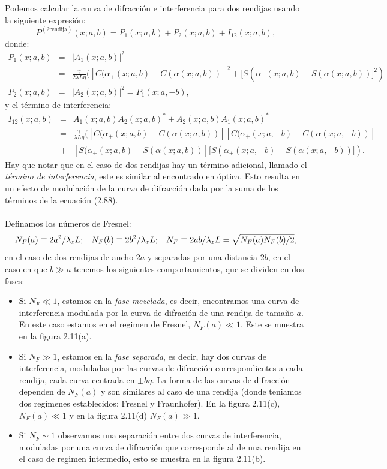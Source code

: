 Podemos calcular la curva de difracción e interferencia para dos rendijas usando la siguiente expresión:
\begin{equation}
P^{(2\text{rendija})}(x;a,b)=P_{1}(x;a,b)+P_{2}(x;a,b)+I_{12}(x;a,b) ,
\end{equation}
donde:
\begin{eqnarray}
\nonumber P_{1}(x;a,b)&=&|A_1(x;a,b)|^2\\
\nonumber &=&\frac{\gamma}{2\lambda L\eta}([C(\alpha_{+}(x;a,b)-C(\alpha(x;a,b))]^{2}+[S(\alpha_{+}(x;a,b)-S(\alpha(x;a,b))]^{2})\\
P_2(x;a,b)&=&|A_2(x;a,b)|^2=P_1(x;a,-b) ,
\end{eqnarray}
y el término de interferencia:
\begin{eqnarray}
\nonumber I_{12}(x;a,b)&=& A_1(x;a,b)A_2(x;a,b)^*+A_2(x;a,b)A_1(x;a,b)^*\\
\nonumber &=&\frac{\gamma}{\lambda L\eta}([C(\alpha_{+}(x;a,b)-C(\alpha(x;a,b))][C(\alpha_{+}(x;a,-b)-C(\alpha(x;a,-b))]\\
&+& [S(\alpha_{+}(x;a,b)-S(\alpha(x;a,b))][S(\alpha_{+}(x;a,-b)-S(\alpha(x;a,-b))]) .
\end{eqnarray}
Hay que notar que en el caso de dos rendijas hay un término adicional, llamado el \textit{término de interferencia}, este es similar al encontrado en óptica. Esto resulta en un efecto de modulación de la curva de difracción dada por la suma de los términos de la ecuación (2.88).\\
\\
Definamos los números de Fresnel:
\begin{equation}
N_F(a)\equiv 2a^2/\lambda_zL ;\hspace{0.3cm} N_F(b)\equiv 2b^2/\lambda_zL ;\hspace{0.3cm} N_F\equiv 2ab/\lambda_zL=\sqrt{N_F(a)N_F(b)/2} ,
\end{equation}
en el caso de dos rendijas de ancho $2a$ y separadas por una distancia $2b$, en el caso en que $b\gg a$ tenemos los siguientes comportamientos, que se dividen en dos fases:
\begin{itemize}
\item Si $N_F\ll 1$, estamos en la \textit{fase mezclada}, es decir, encontramos una curva de interferencia modulada por la curva de difración de una rendija de tamaño $a$. En este caso estamos en el regimen de Fresnel, $N_F(a)\ll 1$. Este se muestra en la figura 2.11(a). 
\item Si $N_F\gg 1$, estamos en la \textit{fase separada}, es decir, hay dos curvas de interferencia, moduladas por las curvas de difracción correspondientes a cada rendija, cada curva centrada en $\pm b\eta$.	La forma de las curvas de difracción dependen de $N_F(a)$ y son similares al caso de una rendija (donde teniamos dos regímenes establecidos: Fresnel y Fraunhofer). En la figura 2.11(c), $N_F(a)\ll 1$ y en la figura 2.11(d) $N_F(a)\gg 1$.
\item Si $N_F\sim 1$ observamos una separación entre dos curvas de interferencia, moduladas por una curva de difracción que corresponde al de una rendija en el caso de regimen intermedio, esto se muestra en la figura 2.11(b). 
\end{itemize}
